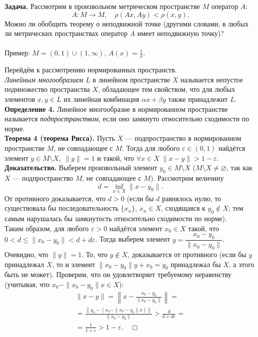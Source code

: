 \documentclass[12pt,a4paper, titlepage]{article}
\begin{document}
\textbf{Задача.} Рассмотрим в произвольном метрическом пространстве $M$ оператор $A$:
$$
A:M\to M, \quad \rho(Ax, Ay) < \rho(x,y).
$$
Можно ли обобщить теорему о неподвижной точке (другими словами, в любых ли метрических пространствах оператор $A$ имеет неподвижную точку)?\\
\\
Пример: $M = (0, 1) \cup (1, \infty)$, $A(x) = \frac1x$.

Перейдём к рассмотрению нормированных пространств.\\

\textit{Линейным многообразием} $L$ в линейном пространстве $X$ называется непустое подмножество пространства $X$, обладающее тем свойством, что для любых элементов $x, y \in L$ их линейная комбинация $\alpha x + \beta y$ также принадлежит $L$.\\

\textbf{Определение 4.} Линейное многообразие в нормированном пространстве называется \textit{подпространством}, если оно замкнуто относительно сходимости по норме.\\

\textbf{Теорема 4 (теорема Рисса).} Пусть $X$ --- подпространство в нормированном пространстве $M$, не совпадающее с $M$. Тогда для любого $\varepsilon \in (0, 1)$ найдётся элемент $y \in M \setminus X, \; \|y\| = 1$ и такой, что  $\forall x \in X \; \|x - y\| > 1 - \varepsilon$.\\
\textbf{Доказательство.} Выберем произвольный элемент $y_0 \in M \setminus X$ ($M \setminus X \neq \varnothing$, так как $X$ --- подпространство $M$, не совпадающее с $M$). Рассмотрим величину
$$
d = \inf_{x\in X} \|x - y_0\|.
$$
От противного доказывается, что $d > 0$ (если бы $d$ равнялось нулю, то существовала бы последовательность $\lbrace x_n \rbrace$, $x_n \in X$, сходящаяся к $y_0 \notin X$; тем самым нарушалась бы замкнутость относительно сходимости по норме).\\

Таким образом, для любого $\varepsilon > 0$ найдётся элемент $x_0 \in X$ такой, что $0 < d \leqslant \|x_0 - y_0\| < d + d \varepsilon$. Тогда выберем элемент $y = \dfrac {x_0 - y_0} {\|x_0 - y_0\|}$. Очевидно, что $\|y\| = 1$. То, что $y \notin X$, доказывается от противного (если бы $y$ принадлежал $X$, то и элемент $\|x_0 - y_0\| y + x_0 = y_0$ принадлежал бы $X$, а этого быть не может). Проверим, что он удовлетворяет требуемому неравенству (учитывая, что $x_0 - \|x_0 - y_0\| x \in X$):
\begin{multline*}
\|x - y\| = \left\|x - \frac {x_0 - y_0}{\|x_0 - y_0\|} \right\| = \\
= \frac {\left\| y_0 - (x_0 - \|x_0 - y_0\| x)\right\|}{\|x_0 - y_0\|} > \frac d {d + d\varepsilon} = \\
= \frac 1 {1+ \varepsilon} > 1 - \varepsilon. \quad \Box
\end{multline*}
\end{document}
